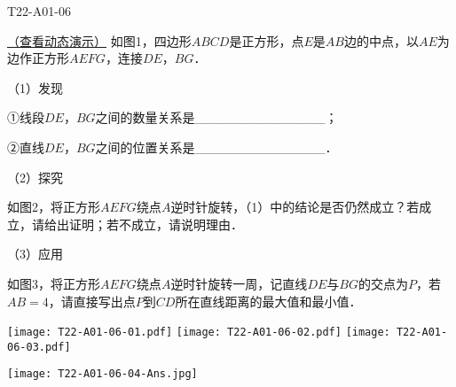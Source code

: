 \begin{defproblem}{T22-A01-06}%
\begin{onlyproblem}%
\href{run:./ItemBankFigures/T22-A01-06.ggb}{（查看动态演示）}
如图1，四边形$ABCD$是正方形，点$E$是$AB$边的中点，以$AE$为边作正方形$AEFG$，连接$DE$，$BG$．

（1）发现

①线段$DE$，$BG$之间的数量关系是{\_}{\_}{\_}{\_}{\_}{\_}{\_}{\_}{\_}{\_}{\_}{\_}{\_}{\_}；

②直线$DE$，$BG$之间的位置关系是{\_}{\_}{\_}{\_}{\_}{\_}{\_}{\_}{\_}{\_}{\_}{\_}{\_}{\_}．

（2）探究

如图2，将正方形$AEFG$绕点$A$逆时针旋转，（1）中的结论是否仍然成立？若成立，请给出证明；若不成立，请说明理由．

（3）应用

如图3，将正方形$AEFG$绕点$A$逆时针旋转一周，记直线$DE$与$BG$的交点为$P$，若$AB=4$，请直接写出点$P$到$CD$所在直线距离的最大值和最小值．

\begin{center}
\texttt{[image: T22-A01-06-01.pdf]}\qquad
\texttt{[image: T22-A01-06-02.pdf]}\qquad
\texttt{[image: T22-A01-06-03.pdf]}
\end{center}



\end{onlyproblem}%
\begin{onlysolution}%
\begin{center}
\texttt{[image: T22-A01-06-04-Ans.jpg]}
\end{center}
\end{onlysolution}%
\end{defproblem}






